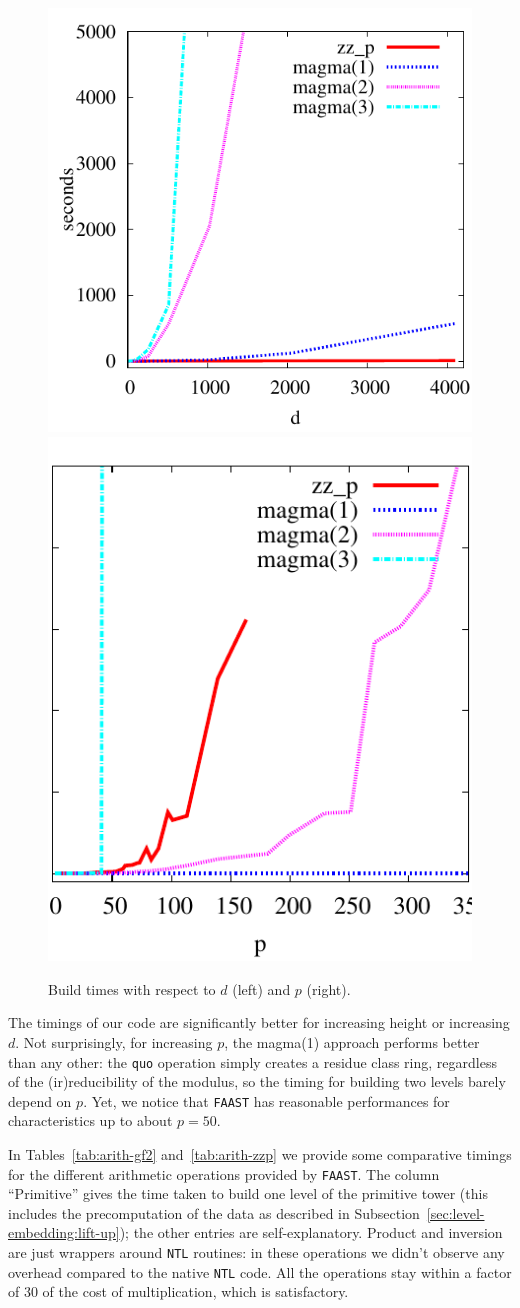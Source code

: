 \begin{figure}
  \centering
  \includegraphics[height=0.5\textwidth]{artin/build-d}
  \includegraphics[height=0.5\textwidth]{artin/build-p}
  
  \caption{Build times with respect to $d$ (left) and $p$ (right).}
  \label{fig:p-d}
\end{figure}

The timings of our code are significantly better for increasing height
or increasing $d$. Not surprisingly, for increasing $p$, the magma(1)
approach performs better than any other: the {\tt quo} operation
simply creates a residue class ring, regardless of the
(ir)reducibility of the modulus, so the timing for building two levels
barely depend on $p$. Yet, we notice that \texttt{FAAST} has
reasonable performances for characteristics up to about $p=50$.

In Tables~\ref{tab:arith-gf2} and~\ref{tab:arith-zzp} we provide some
comparative timings for the different arithmetic operations provided
by \texttt{FAAST}. The column ``Primitive'' gives the time taken to
build one level of the primitive tower (this includes the
precomputation of the data as described in
Subsection~\ref{sec:level-embedding:lift-up}); the other entries are
self-explanatory. Product and inversion are just wrappers around
\texttt{NTL} routines: in these operations we didn't observe any
overhead compared to the native \texttt{NTL} code. All the operations
stay within a factor of $30$ of the cost of multiplication, which is
satisfactory.

